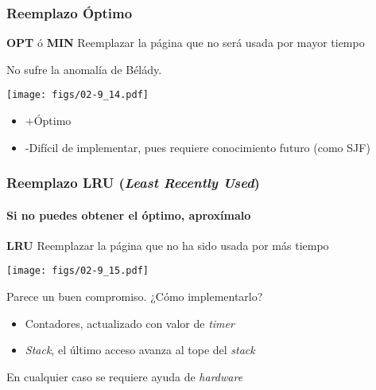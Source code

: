 \documentclass[letter]{beamer}
\begin{document}
\begin{frame}
  \frametitle{Reemplazo Óptimo}

  \begin{block}{{\bf OPT} ó {\bf MIN}}
    Reemplazar la página que no será usada por mayor tiempo
  \end{block}

  No sufre la anomalía de Bélády.

  \begin{center}
    \texttt{[image: figs/02-9\_14.pdf]}
  \end{center}

  \begin{itemize}
    \item +Óptimo
    \item -Difícil de implementar, pues requiere conocimiento futuro (como SJF)
  \end{itemize}

\end{frame}
\begin{frame}
  \frametitle{Reemplazo LRU ({\em Least Recently Used})}
  \framesubtitle{Si no puedes obtener el óptimo, aproxímalo}

  \begin{block}{{\bf LRU}}
    Reemplazar la página que no ha sido usada por más tiempo
  \end{block}
  
  \begin{center}
    \texttt{[image: figs/02-9\_15.pdf]}
  \end{center}

  Parece un buen compromiso. ¿Cómo implementarlo?
  \begin{itemize}
    \item Contadores, actualizado con valor de {\em timer}
    \item {\em Stack}, el último acceso avanza al tope del {\em stack}
  \end{itemize}

  En cualquier caso se requiere ayuda de {\em hardware}
\end{frame}
\end{document}
